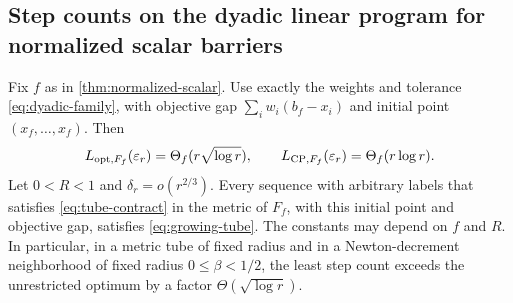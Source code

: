 \subsection{Step counts on the dyadic linear program for normalized scalar barriers}
\begin{corollary}
\label{cor:general-scalar-discrete}
Fix $f$ as in \cref{thm:normalized-scalar}. Use exactly the weights
and tolerance \eqref{eq:dyadic-family}, with objective gap
$\sum_iw_i(b_f-x_i)$ and initial point $(x_f,\ldots,x_f)$.
Then
\[
 L_{\mathrm{opt},F_f}(\varepsilon_r)=\Theta_f(r\sqrt{\log r}),\qquad
 L_{\mathrm{CP},F_f}(\varepsilon_r)=\Theta_f(r\log r).
\]
Let $0<R<1$ and $\delta_r=o(r^{2/3})$. Every sequence with arbitrary
labels that satisfies \eqref{eq:tube-contract} in the metric of $F_f$,
with this initial point and objective gap, satisfies
\eqref{eq:growing-tube}. The constants may depend on $f$ and $R$.
In particular, in a metric tube of fixed radius and in a
Newton-decrement neighborhood of fixed radius $0\leq\beta<1/2$, the
least step count exceeds the unrestricted optimum by a factor
$\Theta(\sqrt{\log r})$.
\end{corollary}
